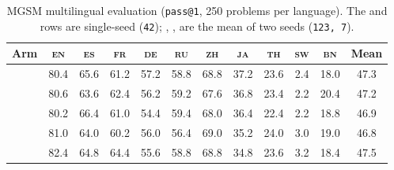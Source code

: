 \begin{table}[t]
\centering\small
\caption{MGSM multilingual evaluation (\texttt{pass@1}, 250 problems per
language). The \base{} and \armD{} rows are single-seed (\texttt{42});
\armA{}, \armB{}, \armC{} are the mean of two seeds (\texttt{123, 7}).}
\label{tab:mgsm}
\begin{tabular}{lccccccccccc}
\toprule
Arm & \textsc{en} & \textsc{es} & \textsc{fr} & \textsc{de} & \textsc{ru} & \textsc{zh} & \textsc{ja} & \textsc{th} & \textsc{sw} & \textsc{bn} & Mean \\
\midrule
\base{} & 80.4 & 65.6 & 61.2 & 57.2 & 58.8 & 68.8 & 37.2 & 23.6 & 2.4 & 18.0 & 47.3 \\
\armA{} & 80.6 & 63.6 & 62.4 & 56.2 & 59.2 & 67.6 & 36.8 & 23.4 & 2.2 & 20.4 & 47.2 \\
\armB{} & 80.2 & 66.4 & 61.0 & 54.4 & 59.4 & 68.0 & 36.4 & 22.4 & 2.2 & 18.8 & 46.9 \\
\armC{} & 81.0 & 64.0 & 60.2 & 56.0 & 56.4 & 69.0 & 35.2 & 24.0 & 3.0 & 19.0 & 46.8 \\
\armD{} & 82.4 & 64.8 & 64.4 & 55.6 & 58.8 & 68.8 & 34.8 & 23.6 & 3.2 & 18.4 & 47.5 \\
\bottomrule
\end{tabular}
\end{table}
